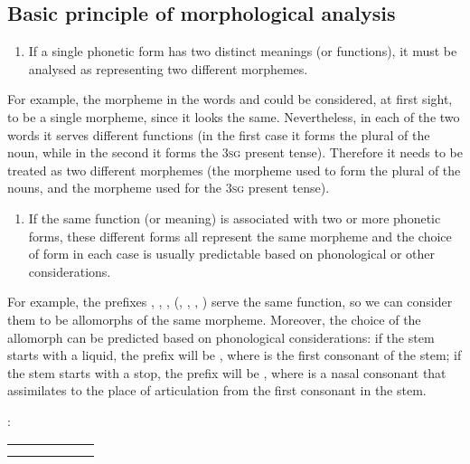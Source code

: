 \begin{refsection}
\section{Basic principle of morphological analysis}
\begin{enumerate}
    \item If a single phonetic form has two distinct meanings (or functions), it must be analysed as representing two different morphemes.
\end{enumerate}

 For example, the morpheme  in the words  and  could be considered, at first sight, to be a single morpheme, since it looks the same. Nevertheless, in each of the two words it serves different functions (in the first case it forms the plural of the noun, while in the second it forms the 3\textsc{sg} present tense). Therefore it needs to be treated as two different morphemes (the morpheme  used to form the plural of the nouns, and the morpheme  used for the 3\textsc{sg} present tense).

\begin{enumerate}[start = 2]
    \item If the same function (or meaning) is associated with two or more phonetic forms, these different forms all represent the same morpheme and the choice of form in each case is usually predictable based on phonological or other considerations.
\end{enumerate}

For example, the prefixes , , ,  (, , , ) serve the same function, so we can consider them to be allomorphs of the same morpheme. Moreover, the choice of the allomorph can be predicted based on phonological considerations: if the stem starts with a liquid, the prefix will be , where  is the first consonant of the stem; if the stem starts with a stop, the prefix will be , where  is a nasal consonant that assimilates to the place of articulation from the first consonant in the stem.


\begin{problem}{\langnameZulu}{\nameVNeacsu}{\wordoriginal}

\IntroWords{\langnameZulu} \IntroAndEnglish:

\begin{table}[H]
\begin{tabularx}{\textwidth}{@{} *3{l@{~~}Q} @{}}
  &   &    &  &     & \\
 &  &       &  &      & \\ 
\end{tabularx}
\end{table}


\end{problem}
\end{refsection}
